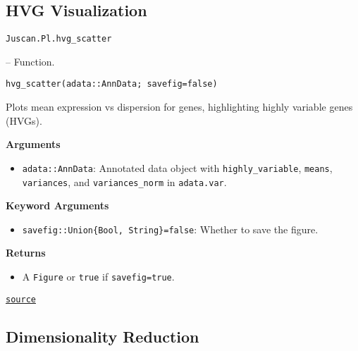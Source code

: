 \documentclass[oneside]{memoir}
\begin{document}
\subsection{HVG Visualization}



\label{13034419661395112617}{}

\hypertarget{9894145985192092715}{\texttt{Juscan.Pl.hvg\_scatter}}  -- {Function.}

\begin{adjustwidth}{2em}{0pt}


\begin{verbatim}
hvg_scatter(adata::AnnData; savefig=false)
\end{verbatim}

Plots mean expression vs dispersion for genes, highlighting highly variable genes (HVGs).

\textbf{Arguments}

\begin{itemize}
\item \texttt{adata::AnnData}: Annotated data object with \texttt{highly\_variable}, \texttt{means}, \texttt{variances}, and \texttt{variances\_norm} in \texttt{adata.var}.

\end{itemize}
\textbf{Keyword Arguments}

\begin{itemize}
\item \texttt{savefig::Union\{Bool, String\}=false}: Whether to save the figure.

\end{itemize}
\textbf{Returns}

\begin{itemize}
\item A \texttt{Figure} or \texttt{true} if \texttt{savefig=true}.

\end{itemize}


\href{https://github.com/zehua0417/Juscan.jl/blob/393ad1b827b678ea98a738f92af658ee9ed9a403/src/plots/plots.jl#L228-L241}{\texttt{source}}


\end{adjustwidth}

\subsection{Dimensionality Reduction}



\label{11472669785569077732}{}
\end{document}
